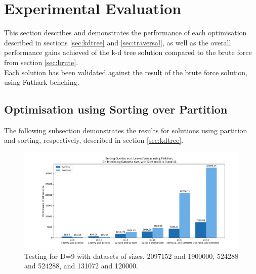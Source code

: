\section{Experimental Evaluation}
\label{sec:eval}




This section describes and demonstrates the performance of each optimisation described in sections \ref{sec:kdtree} and \ref{sec:traversal}, as well as the overall performance gains achieved of the k-d tree solution compared to the brute force from section \ref{sec:brute}.
\\[2mm]
Each solution has been validated against the result of the brute force solution, using Futhark benching.  


\subsection{Optimisation using Sorting over Partition}

The following subsection demonstrates the results for solutions using partition and sorting, respectively, described in section \ref{sec:kdtree}. 


\begin{figure}[H]
\centering
\includegraphics[width=1\textwidth]{pics/plot-figs/new-sort-all-d9.png}
\caption{Testing for D=9 with datasets of sizes‚ 2097152 and 1900000, 524288 and 524288, and 131072 and 120000.}
\label{fig:sort1}
\end{figure}


